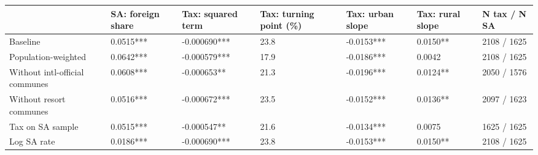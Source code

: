 \begin{tabular}{lllllll}
\toprule
 & SA: foreign share & Tax: squared term & Tax: turning point (\%) & Tax: urban slope & Tax: rural slope & N tax / N SA \\
\midrule
Baseline & 0.0515*** & -0.000690*** & 23.8 & -0.0153*** & 0.0150** & 2108 / 1625 \\
Population-weighted & 0.0642*** & -0.000579*** & 17.9 & -0.0186*** & 0.0042 & 2108 / 1625 \\
Without intl-official communes & 0.0608*** & -0.000653** & 21.3 & -0.0196*** & 0.0124** & 2050 / 1576 \\
Without resort communes & 0.0516*** & -0.000672*** & 23.5 & -0.0152*** & 0.0136** & 2097 / 1623 \\
Tax on SA sample & 0.0515*** & -0.000547** & 21.6 & -0.0134*** & 0.0075 & 1625 / 1625 \\
Log SA rate & 0.0186*** & -0.000690*** & 23.8 & -0.0153*** & 0.0150** & 2108 / 1625 \\
\bottomrule
\end{tabular}
